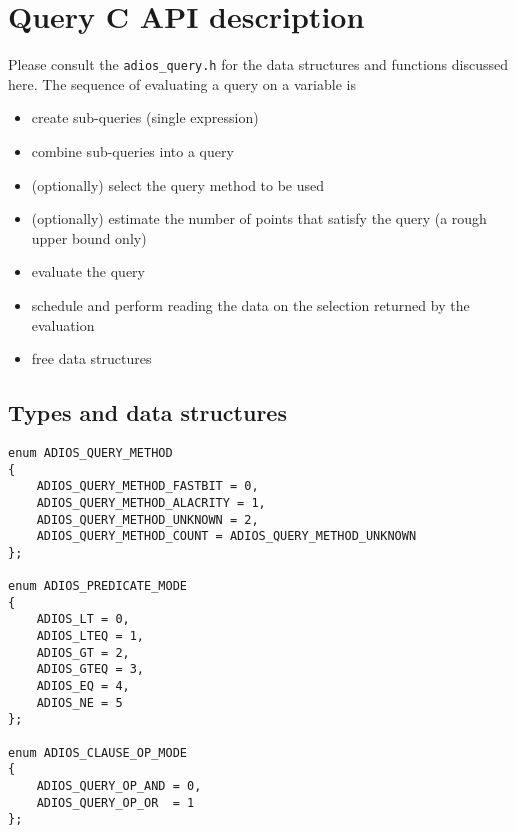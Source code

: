 %
%
\section{Query C API description}

Please consult the \verb+adios_query.h+ for the data structures and functions discussed here.  The sequence of evaluating a query on a variable  is

\begin{itemize}
\renewcommand{\labelitemi}{$-$}
\item create sub-queries (single expression)

\item combine sub-queries into a query

\item (optionally) select the query method to be used

\item (optionally) estimate the number of points that satisfy the query (a rough upper bound only)

\item evaluate the query

\item schedule and perform reading the data on the selection returned by the evaluation

\item free data structures
\end{itemize}

%

\subsection{Types and data structures}
\begin{lstlisting}
enum ADIOS_QUERY_METHOD
{
    ADIOS_QUERY_METHOD_FASTBIT = 0,
    ADIOS_QUERY_METHOD_ALACRITY = 1,
    ADIOS_QUERY_METHOD_UNKNOWN = 2,
    ADIOS_QUERY_METHOD_COUNT = ADIOS_QUERY_METHOD_UNKNOWN
};

enum ADIOS_PREDICATE_MODE
{
    ADIOS_LT = 0,
    ADIOS_LTEQ = 1,
    ADIOS_GT = 2,
    ADIOS_GTEQ = 3,
    ADIOS_EQ = 4,
    ADIOS_NE = 5
};

enum ADIOS_CLAUSE_OP_MODE
{
    ADIOS_QUERY_OP_AND = 0,
    ADIOS_QUERY_OP_OR  = 1
};

\end{lstlisting}



